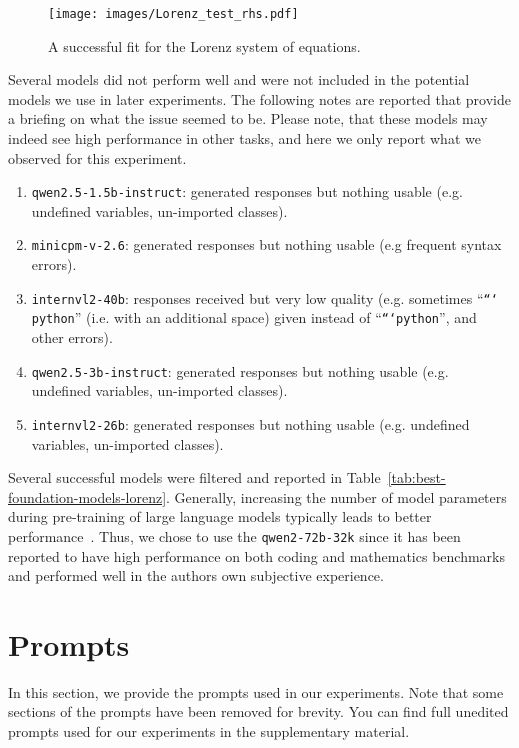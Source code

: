\documentclass{article}
\begin{document}
\begin{figure}
    \centering
    \texttt{[image: images/Lorenz\_test\_rhs.pdf]}
    \caption{A successful fit for the Lorenz system of equations.}
    \label{fig:lorenz-fit}
\end{figure}

Several models did not perform well and were not included in the potential models we use in later experiments.
The following notes are reported that provide a briefing on what the issue seemed to be. 
Please note, that these models may indeed see high performance in other tasks, and here we only report what we observed for this experiment.

\begin{enumerate}
    \item \texttt{qwen2.5-1.5b-instruct}: generated responses but nothing usable (e.g. undefined variables, un-imported classes).
    \item \texttt{minicpm-v-2.6}: generated responses but nothing usable (e.g frequent syntax errors).\
    \item \texttt{internvl2-40b}: responses received but very low quality (e.g. sometimes ``\texttt{``` python}'' (i.e. with an additional space) given instead of ``\texttt{```python}'', and other errors).
    \item \texttt{qwen2.5-3b-instruct}: generated responses but nothing usable (e.g. undefined variables, un-imported classes).
    \item \texttt{internvl2-26b}: generated responses but nothing usable (e.g. undefined variables, un-imported classes).
\end{enumerate}

Several successful models were filtered and reported in Table~\ref{tab:best-foundation-models-lorenz}.
Generally, increasing the number of model parameters during pre-training of large language models typically leads to better performance~\cite{Lan2020Albert}.
Thus, we chose to use the \texttt{qwen2-72b-32k} since it has been reported to have high performance on both coding and mathematics benchmarks~\cite{bai2023} and performed well in the authors own subjective experience.

\newpage

\section{Prompts}

In this section, we provide the prompts used in our experiments.
Note that some sections of the prompts have been removed for brevity.
You can find full unedited prompts used for our experiments in the supplementary material.
\end{document}
